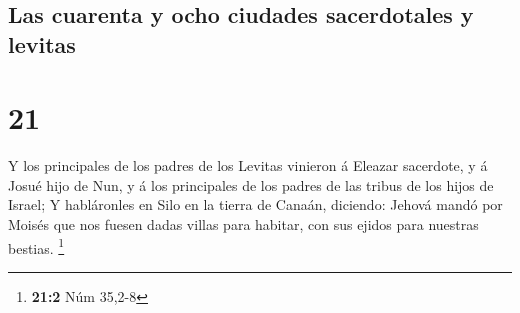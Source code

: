 \hypertarget{las-cuarenta-y-ocho-ciudades-sacerdotales-y-levitas}{%
\subsection{Las cuarenta y ocho ciudades sacerdotales y
levitas}\label{las-cuarenta-y-ocho-ciudades-sacerdotales-y-levitas}}

\hypertarget{section-20}{%
\section{21}\label{section-20}}

 Y los principales de los padres de los Levitas vinieron á
Eleazar sacerdote, y á Josué hijo de Nun, y á los principales de los
padres de las tribus de los hijos de Israel;  Y habláronles
en Silo en la tierra de Canaán, diciendo: Jehová mandó por Moisés que
nos fuesen dadas villas para habitar, con sus ejidos para nuestras
bestias. \footnote{\textbf{21:2} Núm 35,2-8}

